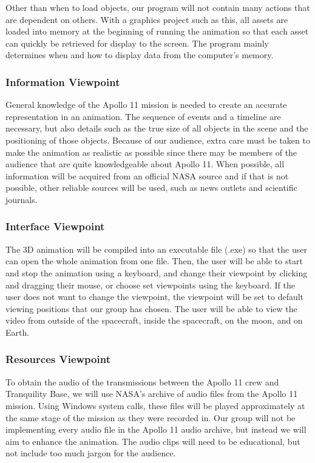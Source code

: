 \documentclass[onecolumn, draftclsnofoot,10pt, compsoc]{IEEEtran}
\begin{document}
    Other than when to load objects, our program will not contain many actions that are dependent on others. With a graphics project such as this, all assets are loaded into memory at the beginning of running the animation so that each asset can quickly be retrieved for display to the screen. The program mainly determines when and how to display data from the computer's memory. 
    
    \subsubsection{Information Viewpoint }

    General knowledge of the Apollo 11 mission is needed to create an accurate representation in an animation. The sequence of events and a timeline are necessary, but also details such as the true size of all objects in the scene and the positioning of those objects. Because of our audience, extra care must be taken to make the animation as realistic as possible since there may be members of the audience that are quite knowledgeable about Apollo 11. When possible, all information will be acquired from an official NASA source and if that is not possible, other reliable sources will be used, such as news outlets and scientific journals. 

    \subsubsection{Interface Viewpoint}
    
   The 3D animation will be compiled into an executable file (.exe) so that the user can open the whole animation from one file. Then, the user will be able to start and stop the animation using a keyboard, and change their viewpoint by clicking and dragging their mouse, or choose set viewpoints using the keyboard. If the user does not want to change the viewpoint, the viewpoint will be set to default viewing positions that our group has chosen. The user will be able to view the video from outside of the spacecraft, inside the spacecraft, on the moon, and on Earth. 

    \subsubsection{Resources Viewpoint}
    To obtain the audio of the transmissions between the Apollo 11 crew and Tranquility Base, we will use NASA's archive of audio files from the Apollo 11 mission. Using Windows system calls, these files will be played approximately at the same stage of the mission as they were recorded in. Our group will not be implementing every audio file in the Apollo 11 audio archive, but instead we will aim to enhance the animation. The audio clips will need to be educational, but not include too much jargon for the audience. 
\end{document}
